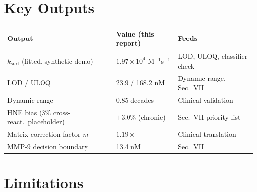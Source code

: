 \documentclass[11pt]{article}
\numberwithin{equation}{section}
\begin{document}
\section{Key Outputs}

\begin{center}
\begin{tabular}{lll}
\toprule
Output & Value (this report) & Feeds \\
\midrule
$k_{\mathrm{surf}}$ (fitted, synthetic demo) & $1.97\times10^4$ M$^{-1}$s$^{-1}$ & LOD, ULOQ, classifier check \\
LOD / ULOQ & 23.9 / 168.2 nM & Dynamic range, Sec.\ VII \\
Dynamic range & 0.85 decades & Clinical validation \\
HNE bias (3\% cross-react.\ placeholder) & $+3.0\%$ (chronic) & Sec.\ VII priority list \\
Matrix correction factor $m$ & $1.19\times$ & Clinical translation \\
MMP-9 decision boundary & 13.4 nM & Sec.\ VII \\
\bottomrule
\end{tabular}
\end{center}

\section{Limitations}
\end{document}
